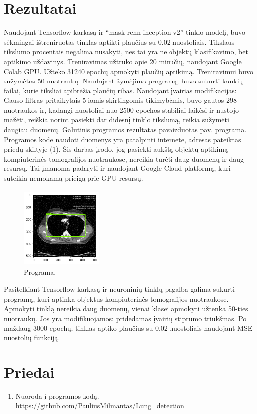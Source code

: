 \documentclass{VUMIFInfKursinis}
\begin{document}
\section{Rezultatai}
\par
Naudojant Tensorflow karkasą ir \enquote{mask rcnn inception v2} tinklo modelį, buvo sėkmingai
ištreniruotas tinklas aptikti plaučius su 0.02 nuostoliais.
Tikslaus tikslumo procentais negalima nusakyti, nes tai yra ne objektų klasifikavimo,
bet aptikimo uždavinys.
Treniravimas užtruko apie 20 minučių,
naudojant Google Colab GPU. Užteko 31240 epochų apmokyti plaučių aptikimą.
Treniravimui buvo sužymėtos 50 nuotraukų. Naudojant žymėjimo programą, buvo sukurti kaukių
failai, kurie tiksliai apibrėžia plaučių ribas. Naudojant įvairias modifikacijas:
Gauso filtras pritaikytais 5-iomis skirtingomis tikimybėmis, buvo gautos 298 nuotraukos ir, 
kadangi nuostoliai nuo 2500 epochos stabiliai laikėsi ir nustojo mažėti, reiškia norint
pasiekti dar didesnį tinklo tikslumą, reikia sužymėti daugiau duomenų.
Galutinis programos rezultatas pavaizduotas pav. programa. Programos kode naudoti
duomenys yra patalpinti internete, adresas pateiktas priedų skiltyje (1).
Šis darbas įrodo, jog pasiekti aukštą
objektų aptikimą kompiuterinės tomografijos nuotraukose, nereikia turėti daug duomenų ir daug
resursų. Tai įmanoma padaryti ir naudojant Google Cloud platformą, kuri suteikia
nemokamą prieigą prie GPU resursų.


\begin{figure}[ht]
  \centering
  \includegraphics[width=4cm,height=4cm,keepaspectratio]{result1.png}
  \caption{Programa.}
  \label{fig:kaukė1}
\end{figure}

\par
Pasitelkiant Tensorflow karkasą ir neuroninių tinklų pagalba galima sukurti programą,
kuri aptinka objektus kompiuterinės tomografijos nuotraukose. Apmokyti tinklą
nereikia daug duomenų, vienai klasei apmokyti užtenka 50-ties nuotraukų.
Jos yra modifikuojamos: pridedamas įvairių stiprumo triukšmas. Po maždaug 3000 epochų,
tinklas aptiko plaučius su 0.02 nuostoliais naudojant MSE nuostolių funkciją.


\printbibliography[heading=bibintoc]

\section*{Priedai}
\begin{enumerate}
\item Nuoroda į programos kodą. https://github.com/PauliusMilmantas/Lung\_detection 
\end{enumerate}
\end{document}
